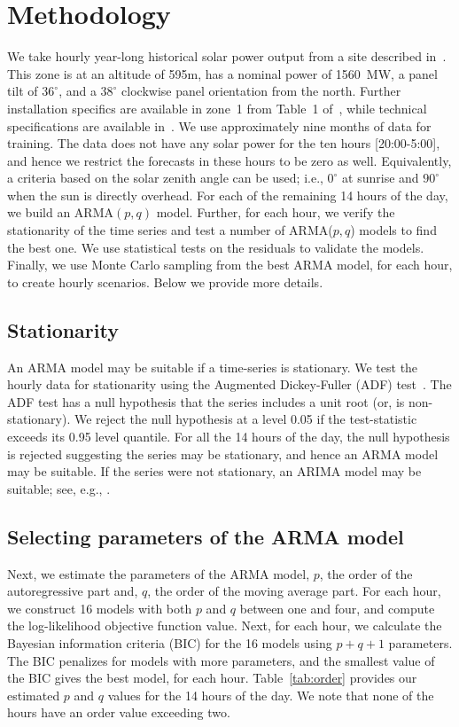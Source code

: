 \documentclass[letter]{IEEEtran}
\begin{document}
\section{Methodology}
We take hourly year-long historical solar power output 
from a site described in~\cite{golestaneh2016generation}. 
This zone is at an altitude of 595m, has a nominal power of 1560~MW, a panel 
tilt 
of $36^\circ$, and a $38^\circ$ clockwise panel orientation from the north. 
Further installation specifics are available in zone~1 from Table~1 
of~\cite{golestaneh2016generation}, while technical specifications are 
available 
in~\cite{technical}.  We use approximately nine months of data 
for training. The data does not have any solar power for the ten hours 
[20:00-5:00], and hence we restrict the forecasts in these hours to be zero as 
well. Equivalently, a criteria based on the solar zenith angle can be used; 
i.e., $0^\circ$ at sunrise and $90^\circ$ when the sun is directly overhead. 
For 
each of the remaining 14 hours of the day, we build an ARMA$(p,q)$ 
model. Further, for each hour, we verify the stationarity of the time 
series and test a number of ARMA($p,q$) models to find the best 
one. We use statistical tests on the residuals to validate the models. Finally, 
we use Monte Carlo sampling from the best ARMA model, for each hour, to create 
hourly scenarios. Below we provide more details.

\subsection{Stationarity}
An ARMA model may be suitable if a time-series is stationary. We test 
the hourly data for stationarity using the Augmented 
Dickey-Fuller (ADF) test~\cite{dickey1979distribution}. The ADF test has a null 
hypothesis that the series includes a unit root (or, is non-stationary). We 
reject the null hypothesis at a level 0.05 if the test-statistic exceeds its 
0.95 level quantile. For all the 14 hours of the day, the null hypothesis is 
rejected suggesting the series may be stationary, and hence an ARMA model may 
be suitable. If the series were not stationary, an ARIMA model may be suitable; 
see, e.g., \cite{contreras2003arima}.

\subsection{Selecting parameters of the ARMA model}
Next, we estimate the parameters of the ARMA model, $p$, the order of the 
autoregressive part and, $q$, the order of the moving average part. For each 
hour, we construct 16 models with both $p$ and $q$ between one and four, and 
compute 
the log-likelihood objective function value. Next, for each hour, we calculate 
the Bayesian information criteria (BIC) for the 16 models using $p + q + 1$ 
parameters.  The BIC penalizes for models with more parameters, and the 
smallest value of the BIC gives the best model, for each 
hour. Table~\ref{tab:order} provides our estimated $p$ and $q$  values for 
the 14 hours of the day. We note that none of the hours have an order value 
exceeding two.
\end{document}
